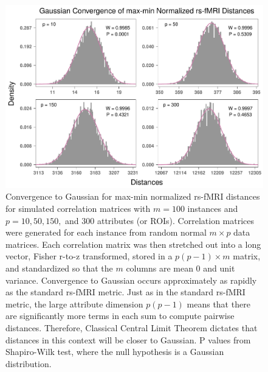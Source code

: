 \documentclass[10pt,letterpaper]{article}\usepackage[]{graphicx}\usepackage[]{color}
\begin{document}
\begin{figure}[H]
	\includegraphics[width=\textwidth]{central_limit_hist_rs-fMRI_max-min.pdf}
	\caption{Convergence to Gaussian for max-min normalized rs-fMRI distances for simulated correlation matrices with $m=100$ instances and $p=10, 50, 150,$ and $300$ attributes (or ROIs). Correlation matrices were generated for each instance from random normal $m \times p$ data matrices. Each correlation matrix was then stretched out into a long vector, Fisher r-to-z transformed, stored in a $p(p-1) \times m$ matrix, and standardized so that the $m$ columns are mean 0 and unit variance. Convergence to Gaussian occurs approximately as rapidly as the standard rs-fMRI metric. Just as in the standard rs-fMRI metric, the large attribute dimension $p(p-1)$ means that there are significantly more terms in each sum to compute pairwise distances. Therefore, Classical Central Limit Theorem dictates that distances in this context will be closer to Gaussian. P values from Shapiro-Wilk test, where the null hypothesis is a Gaussian distribution.}
\end{figure}

\end{document}
